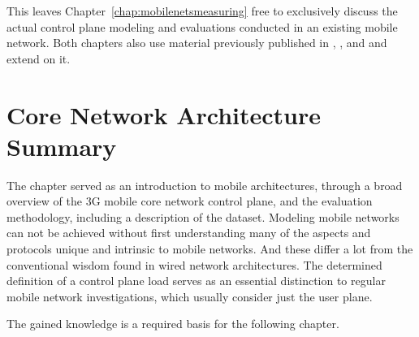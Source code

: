 This leaves Chapter~\ref{chap:mobilenetsmeasuring} free to exclusively discuss the actual control plane modeling and evaluations conducted in an existing mobile network. Both chapters also use material previously published in \cite{metzger2012research}, \cite{metzger2014jcnc}, and \cite{metzger2014lossmodel} and extend on it.














\section{Core Network Architecture Summary}
\label{c41:sec:conclusion}

The chapter served as an introduction to mobile architectures, through a broad overview of the \gls{3G} mobile core network control plane, and the evaluation methodology, including a description of the dataset. Modeling mobile networks can not be achieved without first understanding many of the aspects and protocols unique and intrinsic to mobile networks. And these differ a lot from the conventional wisdom found in wired network architectures. The determined definition of a control plane load serves as an essential distinction to regular mobile network investigations, which usually consider just the user plane.

The gained knowledge is a required basis for the following chapter.



